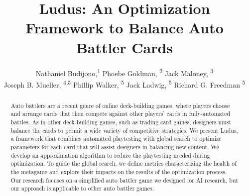\documentclass[letterpaper]{article} %
\title{{\sc Ludus}: An Optimization Framework to Balance Auto Battler Cards}
\author {
    Nathaniel Budijono\equalcontrib,\textsuperscript{\rm 1}
    Phoebe Goldman\equalcontrib, \textsuperscript{\rm 2}
    Jack Maloney\equalcontrib, \textsuperscript{\rm 3} \\
    Joseph B. Mueller, \textsuperscript{\rm 4,5}
    Phillip Walker, \textsuperscript{\rm 5}
    Jack Ladwig, \textsuperscript{\rm 5}
    Richard G. Freedman \textsuperscript{\rm 5}
}
\begin{document}
\maketitle

\begin{abstract}
  Auto battlers are a recent genre of online deck-building games,
  where players choose and arrange cards that then compete against
  other players' cards in fully-automated battles. As in other
  deck-building games, such as trading card games, designers must
  balance the cards to permit a wide variety of competitive
  strategies.  We present {\sc Ludus}, a framework that combines
  automated playtesting with global search to optimize parameters for
  each card that will assist designers in balancing new content.  We
  develop an approximation algorithm to reduce the playtesting needed
  during optimization.  To guide the global search, we define metrics
  characterizing the health of the metagame and explore their impacts
  on the results of the optimization process.  Our research focuses on
  a simplified auto battler game we designed for AI research, but our
  approach is applicable to other auto battler games.
\end{abstract}



\end{document}
